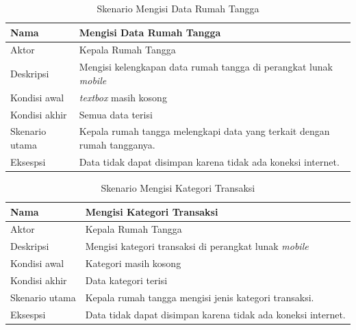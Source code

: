 \begin{table}[H]
	\centering
		\begin{tabular}{ |p{2cm}|p{10cm}| }
			\hline
			Nama &  Mengisi Data Rumah Tangga\\ \hline
			Aktor & Kepala Rumah Tangga  \\ \hline
			Deskripsi & Mengisi kelengkapan data rumah tangga di perangkat lunak \textit{mobile} \\ \hline
			Kondisi awal & \textit{textbox} masih kosong  \\ \hline
			Kondisi akhir & Semua data terisi \\ \hline
			Skenario utama & Kepala rumah tangga melengkapi data yang terkait dengan rumah tangganya. \\ \hline
			Eksespsi & Data tidak dapat disimpan karena tidak ada koneksi internet.  \\ 
			\hline
		\end{tabular}
	\caption{Skenario Mengisi Data Rumah Tangga}
	\label{tab:mendaftarAnggota}
\end{table}

\begin{table}[H]
	\centering
		\begin{tabular}{ |p{2cm}|p{10cm}| }
			\hline
			Nama &  Mengisi Kategori Transaksi\\ \hline
			Aktor & Kepala Rumah Tangga  \\ \hline
			Deskripsi & Mengisi kategori transaksi di perangkat lunak \textit{mobile} \\ \hline
			Kondisi awal & Kategori masih kosong  \\ \hline
			Kondisi akhir & Data kategori terisi \\ \hline
			Skenario utama & Kepala rumah tangga mengisi jenis kategori transaksi. \\ \hline
			Eksespsi & Data tidak dapat disimpan karena tidak ada koneksi internet.  \\ 
			\hline
		\end{tabular}
	\caption{Skenario Mengisi Kategori Transaksi}
	\label{tab:mendaftarkategori}
\end{table}

